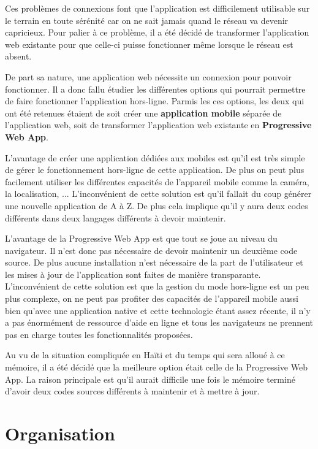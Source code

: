 \documentclass{EPL-master-thesis-covers-FR}
\begin{document}
			Ces problèmes de connexions font que l'application est difficilement utilisable sur le terrain en toute sérénité car on ne sait jamais quand le réseau va devenir capricieux. Pour palier à ce problème, il a été décidé de transformer l'application web existante pour que celle-ci puisse fonctionner même lorsque le réseau est absent.
				
			De part sa nature, une application web nécessite un connexion pour pouvoir fonctionner. Il a donc fallu étudier les différentes options qui pourrait permettre de faire fonctionner l'application hors-ligne. Parmis les ces options,  les deux qui ont été retenues étaient de soit créer une \textbf{application mobile} séparée de l'application web, soit de transformer l'application web existante en \textbf{Progressive Web App}. 
				
			L'avantage de créer une application dédiées aux mobiles est qu'il est très simple de gérer le fonctionnement hors-ligne de cette application. De plus on peut plus facilement utiliser les différentes capacités de l'appareil mobile comme la caméra, la localisation, ...
			L'inconvénient de cette solution est qu'il fallait du coup générer une nouvelle application de A à Z. De plus cela implique qu'il y aura deux codes différents dans deux langages différents à devoir maintenir.
				
			L'avantage de la Progressive Web App est que tout se joue au niveau du navigateur. Il n'est donc pas nécessaire de devoir maintenir un deuxième code source. De plus aucune installation n'est nécessaire de la part de l'utilisateur et les mises à jour de l'application sont faites de manière transparante.
			L'inconvénient de cette solution est que la gestion du mode hors-ligne est un peu plus complexe, on ne peut pas profiter des capacités de l'appareil mobile aussi bien qu'avec une application native et cette technologie étant assez récente, il n'y a pas énormément de ressource d'aide en ligne et tous les navigateurs ne prennent pas en charge toutes les fonctionnalités proposées.
				
			Au vu de la situation compliquée en Haïti et du temps qui sera alloué à ce mémoire, il a été décidé que la meilleure option était celle de la Progressive Web App. La raison principale est qu'il aurait difficile une fois le mémoire terminé d'avoir deux codes sources différents à maintenir et à mettre à jour.

	\chapter{Organisation}
		
\end{document}
